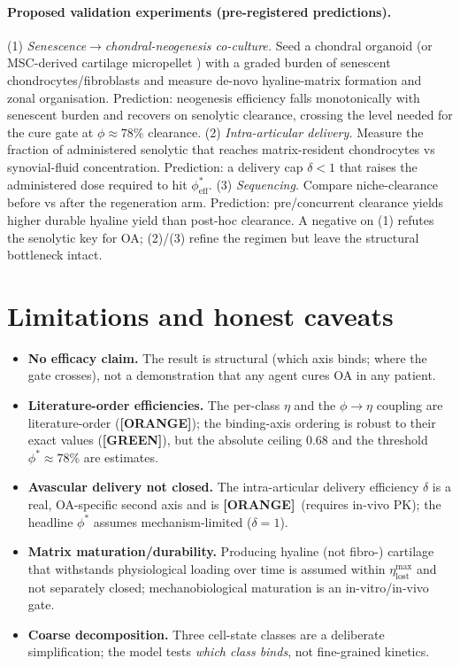 \documentclass[11pt,a4paper]{article}
\newcommand{\tierbadge}[2]{\textcolor{#1}{\textbf{[#2]}}}
\providecommand{\tierGreen}{\tierbadge{green!45!black}{GREEN}}
\providecommand{\tierOrange}{\tierbadge{orange!80!black}{ORANGE}}
\begin{document}
\paragraph{Proposed validation experiments (pre-registered predictions).} (1)
\emph{Senescence$\to$chondral-neogenesis co-culture.} Seed a chondral organoid (or
MSC-derived cartilage micropellet \citep{johnstone1998}) with a graded burden of senescent
chondrocytes/fibroblasts and measure de-novo hyaline-matrix formation and zonal
organisation. Prediction: neogenesis efficiency falls monotonically with senescent burden
and recovers on senolytic clearance, crossing the level needed for the cure gate at
$\phi\!\approx\!78\%$ clearance. (2) \emph{Intra-articular delivery.} Measure the fraction
of administered senolytic that reaches matrix-resident chondrocytes vs synovial-fluid
concentration. Prediction: a delivery cap $\delta<1$ that raises the administered dose
required to hit $\phi^\ast_{\text{eff}}$. (3) \emph{Sequencing.} Compare niche-clearance
before vs after the regeneration arm. Prediction: pre/concurrent clearance yields higher
durable hyaline yield than post-hoc clearance. A negative on (1) refutes the senolytic key
for OA; (2)/(3) refine the regimen but leave the structural bottleneck intact.

\section{Limitations and honest caveats}
\label{sec:limits}
\begin{itemize}\itemsep0.2em
\item \textbf{No efficacy claim.} The result is structural (which axis binds; where the
gate crosses), not a demonstration that any agent cures OA in any patient.
\item \textbf{Literature-order efficiencies.} The per-class $\eta$ and the
$\phi\!\to\!\eta$ coupling are literature-order (\tierOrange); the binding-axis ordering
is robust to their exact values (\tierGreen), but the absolute ceiling $0.68$ and the
threshold $\phi^\ast\!\approx\!78\%$ are estimates.
\item \textbf{Avascular delivery not closed.} The intra-articular delivery efficiency
$\delta$ is a real, OA-specific second axis and is \tierOrange\ (requires in-vivo PK);
the headline $\phi^\ast$ assumes mechanism-limited ($\delta=1$).
\item \textbf{Matrix maturation/durability.} Producing hyaline (not fibro-) cartilage that
withstands physiological loading over time is assumed within $\eta_{\text{lost}}^{\max}$
and not separately closed; mechanobiological maturation \citep{hodgkinson2022} is an
in-vitro/in-vivo gate.
\item \textbf{Coarse decomposition.} Three cell-state classes are a deliberate
simplification; the model tests \emph{which class binds}, not fine-grained kinetics.
\end{itemize}
\end{document}
